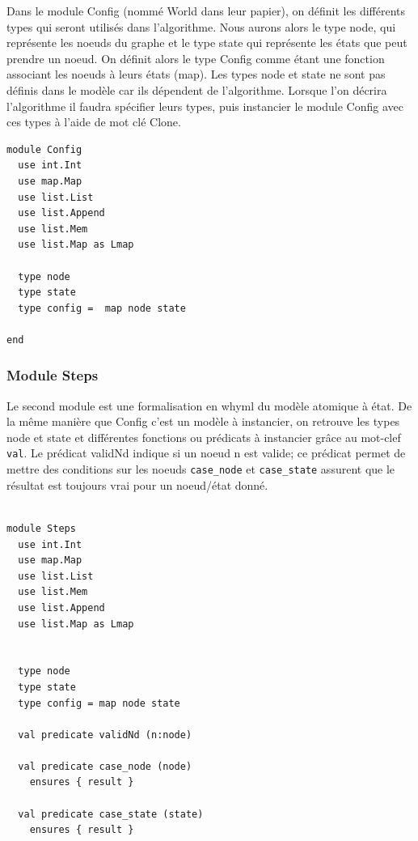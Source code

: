\documentclass[11pt]{article}
\begin{document}
Dans le module Config (nommé World dans leur papier), on définit les différents types qui seront utilisés dans l'algorithme.
Nous aurons alors le type node, qui représente les noeuds du graphe et le type state qui représente les états que peut prendre un noeud.
On définit alors le type Config comme étant une fonction associant les noeuds à leurs états (map).
Les types node et state ne sont pas définis dans le modèle car ils dépendent de l'algorithme. 
Lorsque l'on décrira l'algorithme il faudra spécifier leurs types, puis instancier le module Config avec ces types à l'aide de mot clé Clone. 

\lstset{language=why3,label= ,caption= ,captionpos=b,numbers=none}
\begin{lstlisting}
module Config
  use int.Int
  use map.Map
  use list.List
  use list.Append
  use list.Mem
  use list.Map as Lmap

  type node
  type state
  type config =  map node state

end

\end{lstlisting}

\subsubsection{Module Steps}
\label{sec:org3dadd0e}

Le second module est une formalisation en whyml du modèle atomique à état.
De la même manière que Config c'est un modèle à instancier,
on retrouve les types node et state et différentes fonctions ou prédicats à instancier grâce au mot-clef \texttt{val}. 
Le prédicat validNd indique si un noeud n est valide; ce prédicat permet de mettre des conditions sur les noeuds 
\texttt{case\_node} et \texttt{case\_state} assurent que le résultat est toujours vrai pour un noeud/état donné.
\lstset{language=why3,label= ,caption= ,captionpos=b,numbers=none}
\begin{lstlisting}

module Steps
  use int.Int
  use map.Map
  use list.List
  use list.Mem
  use list.Append
  use list.Map as Lmap


  type node
  type state
  type config = map node state

  val predicate validNd (n:node)

  val predicate case_node (node)
    ensures { result }

  val predicate case_state (state)
    ensures { result }

\end{lstlisting}
\end{document}
